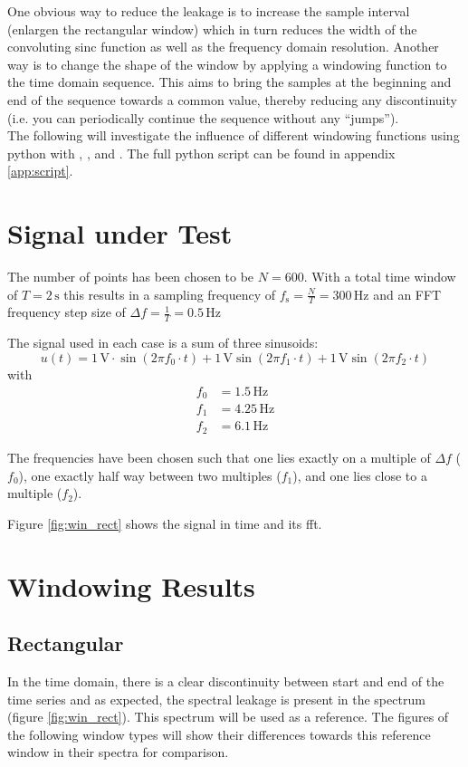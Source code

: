 \documentclass[10pt, a4paper]{article}
\begin{document}
One obvious way to reduce the leakage is to increase the sample interval (enlargen the rectangular window) which in turn reduces the width of the convoluting sinc function as well as the frequency domain resolution.
Another way is to change the shape of the window by applying a windowing function to the time domain sequence. This aims to bring the samples at the beginning and end of the sequence towards a common value, thereby reducing any discontinuity (i.e. you can periodically continue the sequence without any ``jumps''). \cite{understanding_dsp}\\

The following will investigate the influence of different windowing functions using python with , , and . The full python script can be found in appendix \ref{app:script}.

\section{Signal under Test}
The number of points has been chosen to be $N=600$. With a total time window of $T=2\,\si{\second}$ this results in a sampling frequency of $f_{\text{s}} = \frac{N}{T} = 300\,\si{\hertz}$ and an FFT frequency step size of $\Delta f = \frac{1}{T} = 0.5\,\si{\hertz}$

The signal used in each case is a sum of three sinusoids:
\[
u(t) = 1\,\si{\volt} \cdot \sin{(2\pi f_{0} \cdot t)} + 1\,\si{\volt}\sin{(2\pi f_{1} \cdot t)} + 1\,\si{\volt}\sin{(2\pi f_{2} \cdot t)}
\]
with
\begin{align*}
  f_{0} &= 1.5\,\si{\hertz}\\
  f_{1} &= 4.25\,\si{\hertz}\\
  f_{2} &= 6.1\,\si{\hertz}
\end{align*}

The frequencies have been chosen such that one lies exactly on a multiple of $\Delta f$ ($f_{0}$), one exactly half way between two multiples ($f_{1}$), and one lies close to a multiple ($f_{2}$).

Figure \ref{fig:win_rect} shows the signal in time and its fft.


\section{Windowing Results}

\subsection{Rectangular}
In the time domain, there is a clear discontinuity between start and end of the time series and as expected, the spectral leakage is present in the spectrum (figure \ref{fig:win_rect}).
This spectrum will be used as a reference. The figures of the following window types will show their differences towards this reference window in their spectra for comparison.
\end{document}
